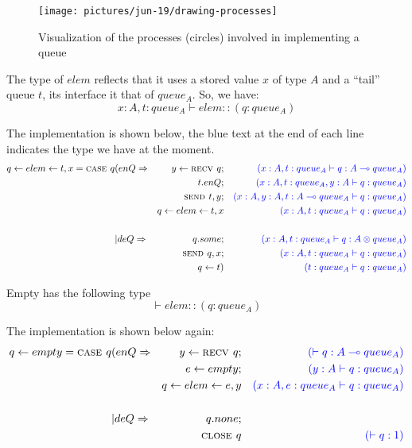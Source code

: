\documentclass{article}
\begin{document}
	\begin{figure}
		\centering
		\texttt{[image: pictures/jun-19/drawing-processes]}
		\caption{Visualization of the processes (circles) involved in implementing a queue}
		\label{fig:drawing-processes}
	\end{figure}
	
	
	The type of \(elem\) reflects that it uses a stored value \(x\) of type \(A\) and a ``tail'' queue \(t\), its interface it that of \(queue_A\). So, we have:
	\[ x:A, t:queue_A \vdash elem :: (q:queue_A) \]
	
	The implementation is shown below, the blue text at the end of each line indicates the type we have at the moment. 
	\begin{align*}
		q \leftarrow elem \leftarrow t,x = \textsc{case } q 
		&(enQ \Rightarrow 
		&y \leftarrow \textsc{recv } q; 
		&& {\color{blue} (x:A, t:queue_A \vdash q:A \multimap queue_A)}\\
		&                 &t.enQ;  
		&& {\color{blue}\qquad (x:A,t:queue_A,y:A\vdash q:queue_A)}\\
		&                 &\textsc{send }t,y;  
		&& {\color{blue}(x:A,y:A,t:A \multimap queue_A\vdash q:queue_A)}\\
		&                 & q \leftarrow elem \leftarrow t,x
		&& {\color{blue}(x:A,t:queue_A\vdash q:queue_A)}\\[1.5em]
		&| deQ \Rightarrow 
		& q.some; 
		&& {\color{blue} (x:A, t:queue_A \vdash q:A \otimes queue_A)}\\
		&& \textsc{send }q,x ; 
		&& {\color{blue} (x:A, t:queue_A \vdash q:queue_A)}\\
		&& q \leftarrow t)
		&& {\color{blue} (t:queue_A \vdash q:queue_A)}
		\end{align*}
		
		
	Empty has the following type
	\[ \vdash elem :: (q:queue_A) \]

	The implementation is shown below again:
		\begin{align*}
	q \leftarrow empty = \textsc{case } q 
	&(enQ \Rightarrow 
	&y \leftarrow \textsc{recv } q; 
	&& {\color{blue} (\vdash q:A \multimap queue_A)}\\
	&                 &e \leftarrow empty;  
	&& {\color{blue}\qquad (y:A\vdash q:queue_A)}\\
	&                 & q \leftarrow elem \leftarrow e,y
	&& {\color{blue}(x:A,e:queue_A\vdash q:queue_A)}\\[1.5em]
	&| deQ \Rightarrow 
	& q.none; 
	&& \\
	&& \textsc{close }q 
	&& {\color{blue} (\vdash q:1)}
	\end{align*}
	
\end{document}
